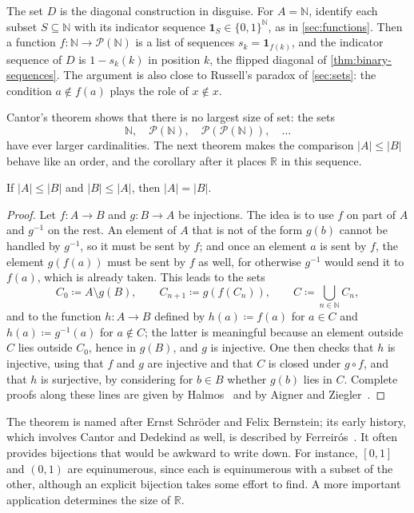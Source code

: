 The set $D$ is the diagonal construction in disguise. For $A=\mathbb N$, identify each subset $S\subseteq\mathbb N$ with its indicator sequence $\mathbf 1_S\in\{0,1\}^{\mathbb N}$, as in \cref{sec:functions}. Then a function $f\colon\mathbb N\to\mathcal P(\mathbb N)$ is a list of sequences $s_k=\mathbf 1_{f(k)}$, and the indicator sequence of $D$ is $1-s_k(k)$ in position $k$, the flipped diagonal of \cref{thm:binary-sequences}. The argument is also close to Russell's paradox of \cref{sec:sets}: the condition $a\notin f(a)$ plays the role of $x\notin x$.

Cantor's theorem shows that there is no largest size of set: the sets
\[
\mathbb N,\quad\mathcal P(\mathbb N),\quad\mathcal P(\mathcal P(\mathbb N)),\quad\ldots
\]
have ever larger cardinalities. The next theorem makes the comparison $|A|\le|B|$ behave like an order, and the corollary after it places $\mathbb R$ in this sequence.

\begin{theorem}
\label{thm:schroeder-bernstein}
If $|A|\le|B|$ and $|B|\le|A|$, then $|A|=|B|$.
\end{theorem}

\begin{proof}
Let $f\colon A\to B$ and $g\colon B\to A$ be injections. The idea is to use $f$ on part of $A$ and $g^{-1}$ on the rest. An element of $A$ that is not of the form $g(b)$ cannot be handled by $g^{-1}$, so it must be sent by $f$; and once an element $a$ is sent by $f$, the element $g(f(a))$ must be sent by $f$ as well, for otherwise $g^{-1}$ would send it to $f(a)$, which is already taken. This leads to the sets
\[
C_0\coloneqq A\setminus g(B),\qquad C_{n+1}\coloneqq g(f(C_n)),\qquad C\coloneqq\bigcup_{n\in\mathbb N}C_n ,
\]
and to the function $h\colon A\to B$ defined by $h(a)\coloneqq f(a)$ for $a\in C$ and $h(a)\coloneqq g^{-1}(a)$ for $a\notin C$; the latter is meaningful because an element outside $C$ lies outside $C_0$, hence in $g(B)$, and $g$ is injective. One then checks that $h$ is injective, using that $f$ and $g$ are injective and that $C$ is closed under $g\circ f$, and that $h$ is surjective, by considering for $b\in B$ whether $g(b)$ lies in $C$. Complete proofs along these lines are given by Halmos~\cite{halmos1960naive} and by Aigner and Ziegler~\cite{aigner2018proofs}.
\end{proof}

The theorem is named after Ernst Schr\"oder and Felix Bernstein; its early history, which involves Cantor and Dedekind as well, is described by Ferreir\'os~\cite{ferreiros2007}. It often provides bijections that would be awkward to write down. For instance, $[0,1]$ and $(0,1)$ are equinumerous, since each is equinumerous with a subset of the other, although an explicit bijection takes some effort to find. A more important application determines the size of $\mathbb R$.

